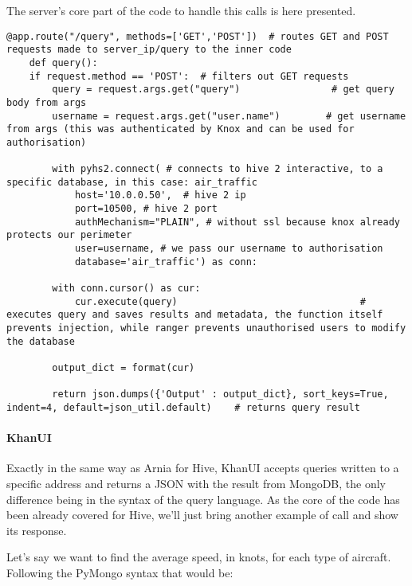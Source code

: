 \pagebreak
The server's core part of the code to handle this calls is here presented.

\begin{code}
	\begin{verbatim}
@app.route("/query", methods=['GET','POST'])  # routes GET and POST requests made to server_ip/query to the inner code
    def query():
    if request.method == 'POST':  # filters out GET requests
        query = request.args.get("query")                # get query body from args
        username = request.args.get("user.name")        # get username from args (this was authenticated by Knox and can be used for authorisation)

        with pyhs2.connect( # connects to hive 2 interactive, to a specific database, in this case: air_traffic
        	host='10.0.0.50',  # hive 2 ip        
            port=10500, # hive 2 port            
            authMechanism="PLAIN", # without ssl because knox already protects our perimeter
            user=username, # we pass our username to authorisation
            database='air_traffic') as conn:
        
        with conn.cursor() as cur:                
            cur.execute(query)                                # executes query and saves results and metadata, the function itself prevents injection, while ranger prevents unauthorised users to modify the database
            
        output_dict = format(cur)

        return json.dumps({'Output' : output_dict}, sort_keys=True, indent=4, default=json_util.default)    # returns query result
	\end{verbatim}
\end{code}

\paragraph{KhanUI}

Exactly in the same way as Arnia for Hive, KhanUI accepts queries written to a specific address and returns a JSON with the result from MongoDB, the only difference being in the syntax of the query language.
As the core of the code has been already covered for Hive, we'll just bring another example of call and show its response.

Let's say we want to find the average speed, in knots, for each type of aircraft. Following the PyMongo syntax that would be:

